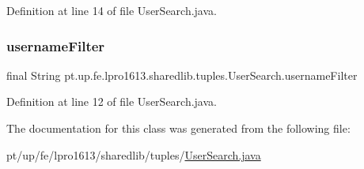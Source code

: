 Definition at line 14 of file User\+Search.\+java.

\hypertarget{classpt_1_1up_1_1fe_1_1lpro1613_1_1sharedlib_1_1tuples_1_1_user_search_ac41460b02d3521bc2f0e9a007e2a51ee}{}\label{classpt_1_1up_1_1fe_1_1lpro1613_1_1sharedlib_1_1tuples_1_1_user_search_ac41460b02d3521bc2f0e9a007e2a51ee} 
\subsubsection{\texorpdfstring{username\+Filter}{usernameFilter}}
{\footnotesize\ttfamily final String pt.\+up.\+fe.\+lpro1613.\+sharedlib.\+tuples.\+User\+Search.\+username\+Filter}



Definition at line 12 of file User\+Search.\+java.



The documentation for this class was generated from the following file\+:\begin{DoxyCompactItemize}
\item 
pt/up/fe/lpro1613/sharedlib/tuples/\hyperlink{_user_search_8java}{User\+Search.\+java}\end{DoxyCompactItemize}
